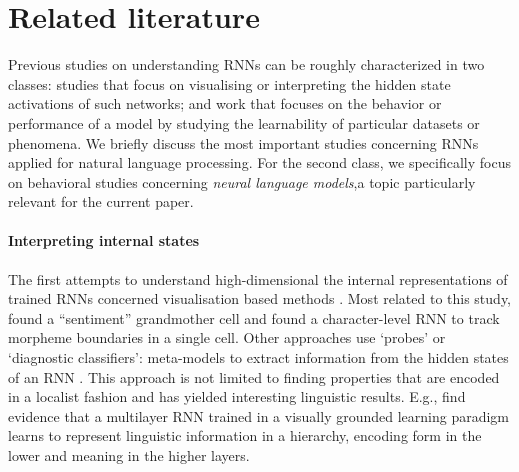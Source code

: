 
\section{Related literature}


Previous studies on understanding RNNs can be roughly characterized in two classes: studies that focus on visualising or interpreting the hidden state activations of such networks; and work that focuses on the behavior or performance of a model by studying the learnability of particular datasets or phenomena.
We briefly discuss the most important studies concerning RNNs applied for natural language processing.
For the second class, we specifically focus on behavioral studies concerning \textit{neural language models},a topic particularly relevant for the current paper.

\paragraph{Interpreting internal states}
The first attempts to understand high-dimensional the internal representations of trained RNNs concerned visualisation based methods \cite{Karpathy:etal:2016,tang2017memory,li2016visualizing,Radford:etal:2017}.
Most related to this study,  found a ``sentiment'' grandmother cell and  found a character-level RNN to track morpheme boundaries in a single cell.
Other approaches use `probes' or `diagnostic classifiers': meta-models to extract information from the hidden states of an RNN \cite{Adi:etal:2017,Hupkes:etal:2017,alain2017understanding}.
This approach is not limited to finding properties that are encoded in a localist fashion and has yielded interesting linguistic results.
E.g.,  find evidence that a multilayer RNN trained in a visually grounded learning paradigm learns to represent linguistic information in a hierarchy, encoding form in the lower and meaning in the higher layers.

